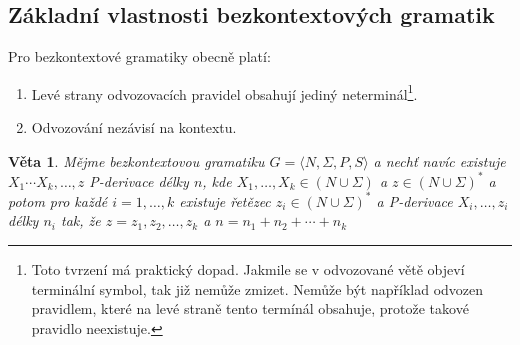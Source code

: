 \documentclass[10pt, a4paper, titlepage]{article}
\theoremstyle{note}
\newtheorem{veta}{Věta}
\begin{document}
\subsection{Základní vlastnosti bezkontextových gramatik}

Pro bezkontextové gramatiky obecně platí:
\begin{enumerate}		%
\item
Levé strany odvozovacích pravidel obsahují jediný neterminál\footnote{Toto tvrzení má praktický dopad. Jakmile se v odvozované větě objeví
terminální symbol, tak již nemůže zmizet. Nemůže být například odvozen pravidlem, které na levé straně tento termínál obsahuje, protože takové pravidlo neexistuje.}.

\item
Odvozování nezávisí na kontextu.
\end{enumerate}

\begin{veta}\label{veta-bez}
Mějme bezkontextovou gramatiku  $G = \langle N, \Sigma, P, S \rangle$ a nechť navíc existuje $X_{1} \cdots X_{k}, \ldots, z$
P-derivace délky $n$, kde $X_{1}, \ldots, X_{k} \in (N \cup \Sigma)$ a $z \in (N \cup \Sigma)^{*}$ 
a potom pro každé $i = 1, \ldots, k$  existuje řetězec $z_{i} \in (N \cup \Sigma)^{*}$ 
a P-derivace $X_{i}, \ldots, z_{i}$ délky $n_{i}$ tak, že $z = z_{1} ,z_{2}, \ldots, z_{k}$ a $n = n_{1} + n_{2} + \cdots + n_{k}$
\end{veta}
\end{document}
